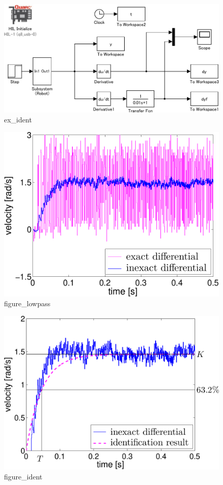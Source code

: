 \begin{figure}[h]
  \centering
  \includegraphics[scale=0.7]{sozai/ex_ident-crop.pdf}
  \caption{ex\_ident}
\end{figure}

\begin{figure}[h]
  \centering
  \includegraphics[scale=0.5]{sozai/figure_lowpass-crop.pdf}
  \caption{figure\_lowpass}
\end{figure}

\begin{figure}[h]
  \centering
  \includegraphics[scale=0.5]{sozai/figure_ident-crop.pdf}
  \caption{figure\_ident}
\end{figure}

